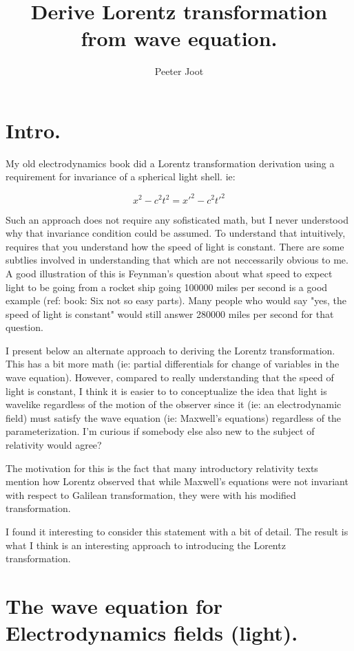 \documentclass{article}      %
\title{Derive Lorentz transformation from wave equation.} %
\author{Peeter Joot}         %
\begin{document}

\maketitle{}

\section{Intro.}

My old electrodynamics book did a Lorentz transformation derivation using a requirement for invariance of a spherical light shell.  ie:

\[
x^2 - c^2 t^2 = {x'}^2 - c^2 {t'}^2
\]

Such an approach does not require any sofisticated math, but I never understood why that invariance condition could be assumed.
To understand that intuitively, requires that you understand how the speed of light is constant.  There are some subtlies 
involved in understanding that which are not neccessarily obvious to me.  A good illustration of this is Feynman's question
about what speed to expect light to be
going from a rocket ship going 100000 miles per second is a good example (ref: book: Six not so easy parts).
Many people who would say "yes, the speed of light is constant" would still answer 280000 miles per second for that question.

I present below an alternate approach to deriving the Lorentz transformation.  This has a bit more math (ie: partial differentials for 
change of variables in the wave equation).  However, compared to really understanding that the speed of light is constant,
I think it is easier to
to conceptualize the idea that light is wavelike regardless of the motion of the observer since it (ie: an electrodynamic field)
must satisfy the wave equation (ie: Maxwell's equations) regardless of the parameterization.  I'm curious if somebody
else also new to the subject of relativity would agree?

The motivation for this is the fact that many introductory relativity texts mention how Lorentz observed that
while Maxwell's equations were not invariant with respect to Galilean
transformation, they were with his modified transformation.

I found it interesting to consider this statement with a bit of detail.  The result is what I think is an interesting approach
to introducing the Lorentz transformation.

\section{ The wave equation for Electrodynamics fields (light).}
\end{document}
